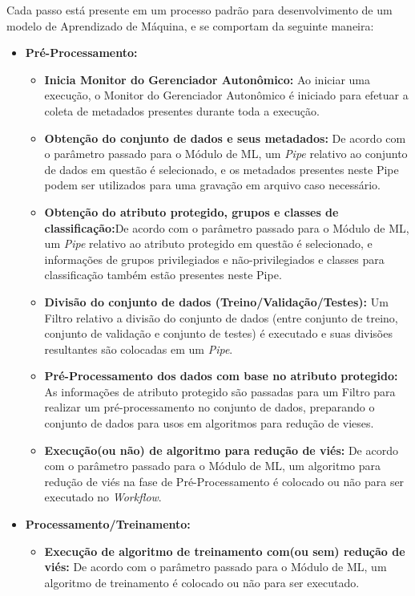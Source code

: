 \documentclass[Portugues,Final]{ic-tese-v3}
\begin{document}
Cada passo está presente em um processo padrão para desenvolvimento de um modelo de Aprendizado de Máquina, e se comportam da seguinte maneira:

\begin{itemize}
\item \textbf{Pré-Processamento:}
	\begin{itemize}
	\item \textbf{Inicia Monitor do Gerenciador Autonômico:} Ao iniciar uma execução, o Monitor do Gerenciador Autonômico é iniciado para efetuar a coleta de metadados presentes durante toda a execução.
	\item \textbf{Obtenção do conjunto de dados e seus metadados:} De acordo com o parâmetro passado para o Módulo de ML, um \textit{Pipe} relativo ao conjunto de dados em questão é selecionado, e os metadados presentes neste Pipe podem ser utilizados para uma gravação em arquivo caso necessário.
	\item \textbf{Obtenção do atributo protegido, grupos e classes de classificação:}De acordo com o parâmetro passado para o Módulo de ML, um \textit{Pipe} relativo ao atributo protegido em questão é selecionado, e informações de grupos privilegiados e não-privilegiados e classes para classificação também estão presentes neste Pipe.
	\item \textbf{Divisão do conjunto de dados (Treino/Validação/Testes):} Um Filtro relativo a divisão do conjunto de dados (entre conjunto de treino, conjunto de validação e conjunto de testes) é executado e suas divisões resultantes são colocadas em um \textit{Pipe}.
	\item \textbf{Pré-Processamento dos dados com base no atributo protegido:} As informações de atributo protegido são passadas para um Filtro para realizar um pré-processamento no conjunto de dados, preparando o conjunto de dados para usos em algoritmos para redução de vieses.
	\item \textbf{Execução(ou não) de algoritmo para redução de viés:} De acordo com o parâmetro passado para o Módulo de ML, um algoritmo para redução de viés na fase de Pré-Processamento é colocado ou não para ser executado no \textit{Workflow}. 
	\end{itemize}
\item \textbf{Processamento/Treinamento:}
	\begin{itemize}
	\item \textbf{Execução de algoritmo de treinamento com(ou sem) redução de viés:} De acordo com o parâmetro passado para o Módulo de ML, um algoritmo de treinamento é colocado ou não para ser executado.

\end{itemize}
\end{itemize}
\end{document}
